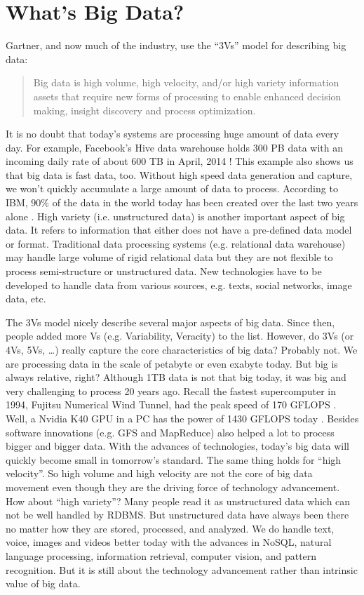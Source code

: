 \documentclass[12pt]{book}
\begin{document}
\section{What's Big Data?}
Gartner, and now much of the industry, use the ``3Vs'' model \cite{Laney2012} for describing big data:
\begin{quote}
Big data is high volume, high velocity, and/or high variety information assets that require new forms of processing to enable enhanced decision making, insight discovery and process optimization.
\end{quote}
It is no doubt that today's systems are processing huge amount of data every day. For example, Facebook's Hive data warehouse holds 300 PB data with an incoming daily rate of about 600 TB in April, 2014 \cite{VagateWilfong2014}! This example also shows us that big data is fast data, too. Without high speed data generation and capture, we won't quickly accumulate a large amount of data to process. According to IBM, $90\%$ of the data in the world today has been created over the last two years alone \cite{IBM2013}. High variety (i.e. unstructured data) is another important aspect of big data. It refers to information that either does not have a pre-defined data model or format. Traditional data processing systems (e.g. relational data warehouse) may handle large volume of rigid relational data but they are not flexible to process semi-structure or unstructured data. New technologies have to be developed to handle data from various sources, e.g. texts, social networks, image data, etc.

The 3Vs model nicely describe several major aspects of big data. Since then, people added more Vs (e.g. Variability, Veracity) to the list. However, do 3Vs (or 4Vs, 5Vs, \ldots) really capture the core characteristics of big data? Probably not. We are processing data in the scale of petabyte or even exabyte today. But big is always relative, right? Although 1TB data is not that big today, it was big and very challenging to process 20 years ago. Recall the fastest supercomputer in 1994, Fujitsu Numerical Wind Tunnel, had the peak speed of 170 GFLOPS \cite{Top500}. Well, a Nvidia K40 GPU in a PC has the power of 1430 GFLOPS today \cite{Nvidia2014}. Besides software innovations (e.g. GFS and MapReduce) also helped a lot to process bigger and bigger data. With the advances of technologies, today's big data will quickly become small in tomorrow's standard. The same thing holds for ``high velocity''. So high volume and high velocity are not the core of big data movement even though they are the driving force of technology advancement. How about ``high variety''? Many people read it as unstructured data which can not be well handled by RDBMS. But unstructured data have always been there no matter how they are stored, processed, and analyzed. We do handle text, voice, images and videos better today with the advances in NoSQL, natural language processing, information retrieval, computer vision, and pattern recognition. But it is still about the technology advancement rather than intrinsic value of big data.
\end{document}
